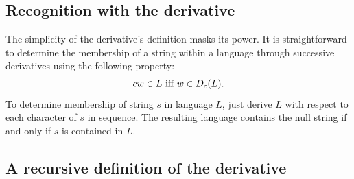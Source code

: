 \subsection{Recognition with the derivative}
%
The simplicity of the derivative's definition masks its power.
%
It is straightforward to determine the membership of a string within a language
through successive derivatives using the following property:
\begin{align*}
  cw \in L \text{ iff } w \in D_c(L)
  \text.
\end{align*}
%
To determine membership of string $s$ in language $L$, just derive $L$ with
respect to each character of $s$ in sequence.
%
The resulting language contains the null string if and only if $s$ is contained
in $L$.

\subsection{A recursive definition of the derivative}

